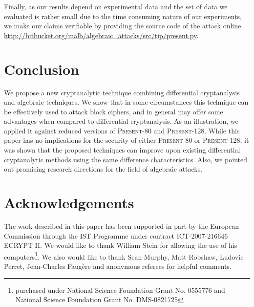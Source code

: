 \documentclass{llncs}
\newcommand{\blind}[1]{#1}
\newcommand{\PRESENT}{\textsc{Present}\xspace}
\begin{document}
Finally, as our results depend on experimental data and the set of data we
evaluated is rather small due to the time consuming nature of our
experiments,  we make our claims verifiable by providing the source code of
the attack
online
\blind{\url{http://bitbucket.org/malb/algebraic_attacks/src/tip/present.py}}.


\section{Conclusion}
We propose a new cryptanalytic technique combining differential cryptanalysis
and algebraic techniques. We show that in some circumstances this
technique can be effectively used to attack block ciphers, and in general
may offer some advantages when compared to differential cryptanalysis.
As an illustration, we applied it against reduced versions of \PRESENT-80 and
\PRESENT-128. While this paper has no implications for the security of
either \PRESENT-80 or \PRESENT-128, it was shown that the proposed techniques
can improve upon existing differential cryptanalytic methods using the same
difference characteristics. Also, we pointed out promising
research directions for the field of algebraic attacks.

\blind{
\section*{Acknowledgements}
The work described in this paper has been supported in part by the European
Commission through the IST Programme under contract ICT-2007-216646 ECRYPT II.
We would like to thank William Stein for allowing the use of his
computers\footnote{purchased under National Science Foundation Grant No.
0555776 and National Science Foundation Grant No. DMS-0821725}. We also would
like to thank Sean Murphy, Matt Robshaw, Ludovic Perret, Jean-Charles
Faug{\`e}re and anonymous referees for helpful comments.
}




\newpage
\appendix
\end{document}
